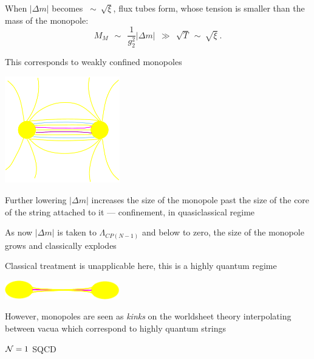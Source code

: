 \documentclass[12pt,letterpaper,landscape,KOMA,smallheadings,calcdimensions,display]{powersem}
\begin{document}
\begin{slide}
	When $ |\Delta m | $ becomes  $ ~\sim~ \sqrt{\xi}$, flux tubes form, whose 
	tension is smaller than the mass of the monopole:
\[
	M_M  ~~\sim~~ \frac{1}{g_2^2}|\Delta m| ~~\gg~~  \sqrt{T} ~\sim~ \sqrt{\xi}~\text{.}
\]

	This corresponds to weakly confined monopoles
\begin{center}
\includegraphics[width=5.0cm]{weak_conf.pdf}
\end{center}

\end{slide}

\begin{slide}
	
	Further lowering $ |\Delta m| $ increases the size of the monopole
	past the size of the core of the string attached to it --- confinement,
	in quasiclassical regime 

	As now $ |\Delta m| $ is taken to $ \Lambda_{CP(N-1)} $ and below to zero,
	the size of the monopole grows and classically explodes

	Classical treatment is unapplicable here, this is a highly quantum regime

\begin{center}
\includegraphics[width=5.0cm]{quant_conf.pdf}
\end{center}

	However, monopoles are seen as \emph{kinks} on the worldsheet theory
	interpolating between vacua which correspond to highly quantum strings

\end{slide}

\begin{slide}
\vspace*{3.0cm}
\fontsize{40pt}{40pt}\selectfont
\begin{center} 
	$\mathcal{N}=1$ SQCD 
\end{center}
	
\vspace*{\fill}
\end{slide}
\end{document}
